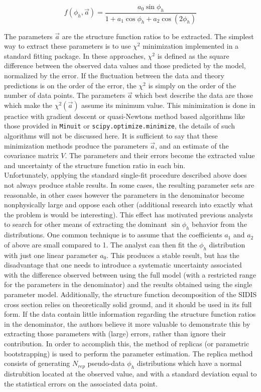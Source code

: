 \begin{equation}
  f(\phi_h, \vec{a}) = \frac{a_0 \sin\phi_h}{1 + a_1 \cos\phi_h + a_2 \cos(2\phi_h)}
\end{equation}

The parameters $\vec{a}$ are the structure function ratios to be extracted.  The simplest way to extract these parameters is to use $\chi^2$ minimization implemented in a standard fitting package.  In these approaches, $\chi^2$ is defined as the square difference between the observed data values and those predicted by the model, normalized by the error.  If the fluctuation between the data and theory predictions is on the order of the error, the $\chi^2$ is simply on the order of the number of data points.  The parameters $\vec{a}$ which best describe the data are those which make the $\chi^2 (\vec{a})$ assume its minimum value.  This minimization is done in practice with gradient descent or quasi-Newtons method based algorithms like those provided in \texttt{Minuit} or \texttt{scipy.optimize.minimize}, the details of such algorithms will not be discussed here.  It is sufficient to say that these minimization methods produce the parameters $\vec{a}$, and an estimate of the covariance matrix $V$.  The parameters and their errors become the extracted value and uncertainty of the structure function ratio in each bin. \\

Unfortunately, applying the standard single-fit procedure described above does not always produce stable results.  In some cases, the resulting parameter sets are reasonable, in other cases however the parameters in the denominator become nonphysically large and oppose each other (additional research into exactly what the problem is would be interesting).  This effect has motivated previous analysts to search for other means of extracting the dominant $\sin\phi_h$ behavior from the distributions.  One common technique is to assume that the coefficients $a_1$ and $a_2$ of above are small compared to 1.  The analyst can then fit the $\phi_h$ distribution with just one linear parameter $a_0$.  This produces a stable result, but has the disadvantage that one needs to introduce a systematic uncertainty associated with the difference observed between using the full model (with a restricted range for the parameters in the denominator) and the results obtained using the single parameter model.  Additionally, the structure function decomposition of the SIDIS cross section relies on theoretically solid ground, and it should be used in its full form.  If the data contain little information regarding the structure function ratios in the denominator, the authors believe it more valuable to demonstrate this by extracting those parameters with (large) errors, rather than ignore their contribution.  In order to accomplish this, the method of replicas (or parametric bootstrapping) is used to perform the parameter estimation.  The replica method consists of generating $N_{rep}$ pseudo-data $\phi_h$ distributions which have a normal distrubition located at the observed value, and with a standard deviation equal to the statistical errors on the associated data point.  

